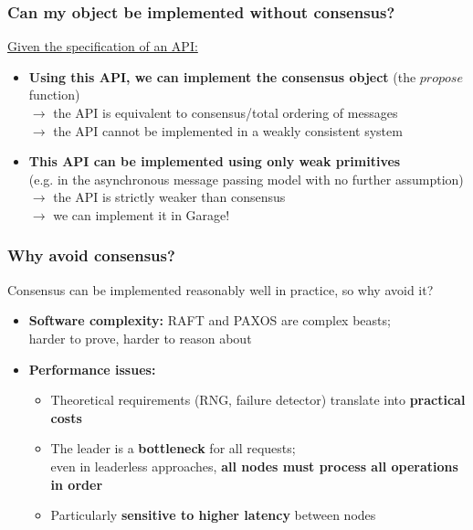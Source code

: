 \documentclass[aspectratio=169]{beamer}
\begin{document}
\begin{frame}
	\frametitle{Can my object be implemented without consensus?}
	\underline{Given the specification of an API:}
	\vspace{2em}
	\begin{itemize}
		\item \textbf{Using this API, we can implement the consensus object} (the $propose$ function)\\
			$\to$ the API is equivalent to consensus/total ordering of messages\\
			$\to$ the API cannot be implemented in a weakly consistent system
			\vspace{2em}
		\item \textbf{This API can be implemented using only weak primitives}\\
			(e.g. in the asynchronous message passing model with no further assumption)\\
			$\to$ the API is strictly weaker than consensus\\
			$\to$ we can implement it in Garage!
	\end{itemize}
\end{frame}

\begin{frame}
	\frametitle{Why avoid consensus?}
	Consensus can be implemented reasonably well in practice, so why avoid it?
	\vspace{2em}
	\begin{itemize}
		\item \textbf{Software complexity:} RAFT and PAXOS are complex beasts;\\
			harder to prove, harder to reason about
			\vspace{1.5em}
		\item \textbf{Performance issues:}
			\vspace{1em}
			\begin{itemize}
				\item Theoretical requirements (RNG, failure detector) translate into \textbf{practical costs}
					\vspace{1em}
				\item The leader is a \textbf{bottleneck} for all requests;\\
					even in leaderless approaches, \textbf{all nodes must process all operations in order}
					\vspace{1em}
				\item Particularly \textbf{sensitive to higher latency} between nodes
			\end{itemize}
	\end{itemize}
\end{frame}
\end{document}
